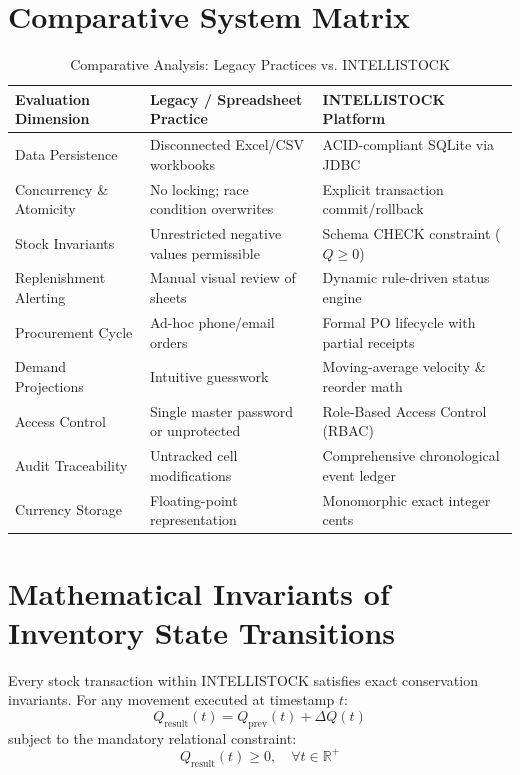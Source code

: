\documentclass[BTech]{srmuthesis}
\begin{document}
\section{Comparative System Matrix}
\begin{table}[htpb]
\centering
\caption{Comparative Analysis: Legacy Practices vs. INTELLISTOCK}
\begin{tabular}{|p{35mm}|p{55mm}|p{55mm}|}
\hline
\textbf{Evaluation Dimension} & \textbf{Legacy / Spreadsheet Practice} & \textbf{INTELLISTOCK Platform} \\ \hline
Data Persistence & Disconnected Excel/CSV workbooks & ACID-compliant SQLite via JDBC \\ \hline
Concurrency \& Atomicity & No locking; race condition overwrites & Explicit transaction commit/rollback \\ \hline
Stock Invariants & Unrestricted negative values permissible & Schema CHECK constraint ($Q \ge 0$) \\ \hline
Replenishment Alerting & Manual visual review of sheets & Dynamic rule-driven status engine \\ \hline
Procurement Cycle & Ad-hoc phone/email orders & Formal PO lifecycle with partial receipts \\ \hline
Demand Projections & Intuitive guesswork & Moving-average velocity \& reorder math \\ \hline
Access Control & Single master password or unprotected & Role-Based Access Control (RBAC) \\ \hline
Audit Traceability & Untracked cell modifications & Comprehensive chronological event ledger \\ \hline
Currency Storage & Floating-point representation & Monomorphic exact integer cents \\ \hline
\end{tabular}
\label{tab:comp_matrix}
\end{table}

\section{Mathematical Invariants of Inventory State Transitions}
Every stock transaction within INTELLISTOCK satisfies exact conservation invariants. For any movement executed at timestamp $t$:
\begin{equation}
Q_{\text{result}}(t) = Q_{\text{prev}}(t) + \Delta Q(t)
\label{eq:inv_state}
\end{equation}
subject to the mandatory relational constraint:
\begin{equation}
Q_{\text{result}}(t) \ge 0, \quad \forall t \in \mathbb{R}^+
\label{eq:non_negative}
\end{equation}
\end{document}
